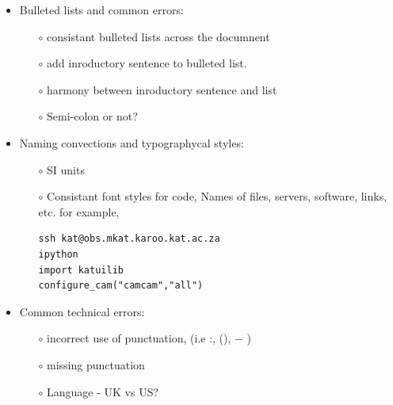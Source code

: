 \documentclass[30pt]{report}
\begin{document}
{\begin{itemize}
\begin{figure}[H]
	\caption{Good image}
	\label{fig:image2}
\end{figure}
\clearpage
\noindent
\item Bulleted lists and common errors:
 \begin{itemize} 
	
	\item[$\circ$]  consistant bulleted lists across the documnent
	\item[$\circ$]  add inroductory sentence to bulleted list.
	\item[$\circ$]  harmony between inroductory sentence and list
	\item[$\circ$]  Semi-colon or not?

\end{itemize}
\item Naming convections and typographycal styles:
\begin{itemize} 
	
	\item[$\circ$] SI units
	\item[$\circ$] Consistant font styles for code, Names of files, servers, software, links, etc. for example,
\begin{lstlisting}[style=DOS]
ssh kat@obs.mkat.karoo.kat.ac.za
ipython			
import katuilib
configure_cam("camcam","all")
\end{lstlisting}
		
\end{itemize}

\item Common technical errors: 
\begin{itemize} 
	
   \item[$\circ$]  incorrect use of punctuation, (i.e :, (), $-$ )
	\item[$\circ$] missing punctuation
	 \item[$\circ$] Language - UK vs US?
	
\end{itemize}


\end{itemize}

} 



	
\end{document}
